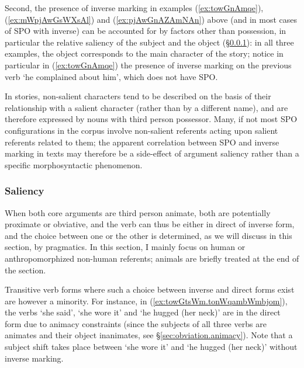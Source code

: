 
Second, the presence of inverse marking in examples (\ref{ex:towGnAmqe}), (\ref{ex:mWpjAwGsWXsAl}) and (\ref{ex:pjAwGnAZAmNAn}) above (and in most cases of SPO with inverse) can be accounted for by factors other than possession, in particular the relative saliency of the subject and the object (§\ref{sec:obviation.saliency}): in all three examples, the object corresponds to the main character of the story; notice in particular in (\ref{ex:towGnAmqe}) the presence of inverse marking on the previous verb  `he complained about him', which does not have SPO. 

In stories, non-salient characters tend to be described on the basis of their relationship with a salient character (rather than by a different name), and are therefore expressed by nouns with third person possessor. Many, if not most SPO configurations in the corpus involve non-salient referents acting upon salient referents related to them; the apparent correlation between SPO and inverse marking in texts may therefore be a side-effect of argument saliency rather than a specific morphosyntactic phenomenon.


\subsubsection{Saliency}  \label{sec:obviation.saliency}
When both core arguments are third person animate, both are potentially proximate or obviative, and the verb can thus be either in direct of inverse form, and the choice between one or the other is determined, as we will discuss in this section, by pragmatics. In this section, I mainly focus on human or anthropomorphized non-human referents; animals are briefly treated at the end of the section.

Transitive verb forms where such a choice between inverse and direct forms exist are however a minority. For instance, in  (\ref{ex:towGtsWm.tonWqambWmbjom}), the verbs  `she said',  `she wore it' and  `he hugged (her neck)' are in the direct form due to animacy constraints (since the subjects of all three verbs are animates and their object inanimates, see §\ref{sec:obviation.animacy}). Note that a subject shift takes place between   `she wore it' and  `he hugged (her neck)' without inverse marking.

